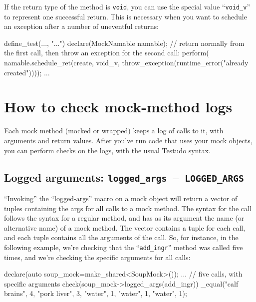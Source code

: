 \documentclass[twoside, a4paper, article]{memoir}
\newcommand*\testudocolor{\color{red!80!blue}}
\newcommand*\testudo[1]{\texttt{\testudocolor{}#1}}
\newcommand*\testudopair[2]{\testudo{#1}~--~\testudo{#2}}
\newcommand\subsectiontestudopair[3]{%
  \subsection[#1]{#1: \testudopair{#2}{#3}}}
\begin{document}
If the return type of the method is \texttt{void}, you can use the special
value ``\texttt{void\_v}'' to represent one successful return.  This is
necessary when you want to schedule an exception after a number of uneventful
returns:
\begin{cpplisting}
define_test(..., "...") {
  declare(MockNamable namable);
  // return normally from the first call, then throw an exception for the %
     second call:
  perform(
    namable.schedule_ret(create,
      void_v,
      throw_exception(runtime_error("already created"))));
  ...
}

\end{cpplisting}

\section{How to check mock-method logs}
\label{sec:check-mock-method-logs}

Each mock method (mocked or wrapped) keeps a log of calls to it, with arguments
and return values.  After you've run code that uses your mock objects, you can
perform checks on the logs, with the usual Testudo syntax.

\subsectiontestudopair{Logged arguments}{logged\_args}{LOGGED\_ARGS}

``Invoking'' the ``logged-args'' macro on a mock object will return a vector of
tuples containing the args for all calls to a mock method.  The syntax for the
call follows the syntax for a regular method, and has as its argument the name
(or alternative name) of a mock method.  The vector contains a tuple for each
call, and each tuple contains all the arguments of the call.  So, for instance,
in the following example, we're checking that the ``\texttt{add\_ingr}'' method
was called five times, and we're checking the specific arguments for all calls:
\begin{cpplisting}
declare(auto soup_mock=make_shared<SoupMock>());
...
// five calls, with specific arguments
check(soup_mock->logged_args(add_ingr))
  _equal({{"calf brains", 4},
          {"pork liver", 3},
          {"water", 1},
          {"water", 1},
          {"water", 1}});
\end{cpplisting}
\end{document}
